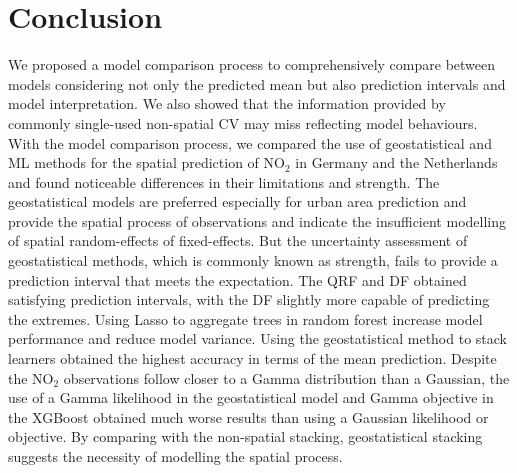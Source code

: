 \documentclass{article}
\begin{document}
\section{Conclusion}
We proposed a model comparison process to comprehensively compare between models considering not only the predicted mean but also prediction intervals and model interpretation. We also showed that the information provided by commonly single-used non-spatial CV may miss reflecting model behaviours. With the model comparison process, we compared the use of geostatistical and ML methods for the spatial prediction of NO$_2$ in Germany and the Netherlands and found noticeable differences in their limitations and strength. The geostatistical models are preferred especially for urban area prediction and provide the spatial process of observations and indicate the insufficient modelling of spatial random-effects of fixed-effects. But the uncertainty assessment of geostatistical methods, which is commonly known as strength, fails to provide a prediction interval that meets the expectation. The QRF and DF obtained satisfying prediction intervals, with the DF slightly more capable of predicting the extremes. Using Lasso to aggregate trees in random forest increase model performance and reduce model variance. Using the geostatistical method to stack learners obtained the highest accuracy in terms of the mean prediction. Despite the NO$_2$ observations follow closer to a Gamma distribution than a Gaussian, the use of a Gamma likelihood in the geostatistical model and Gamma objective in the XGBoost obtained much worse results than using a Gaussian likelihood or objective. By comparing with the non-spatial stacking, geostatistical stacking suggests the necessity of modelling the spatial process.  

\newpage



\end{document}
